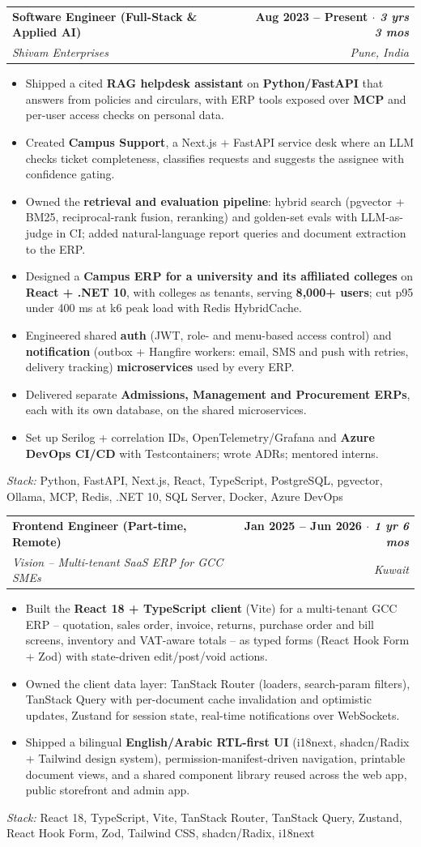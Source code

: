 \documentclass[letterpaper,10pt]{article}
\makeatletter
\newcommand{\resumeItem}[1]{\item\small{{#1 \vspace{-1.5pt}}}}
\newcommand{\resumeTech}[1]{\item[]{\small\textit{Stack:} #1}\vspace{0pt}}
\newcommand{\resumeSubheading}[4]{
  \vspace{-2pt}\item
    \begin{tabular*}{1.0\textwidth}[t]{l@{\extracolsep{\fill}}r}
      \textbf{#1} & \textbf{\small #2} \\
      \textit{\small#3} & \textit{\small #4} \\
    \end{tabular*}\vspace{-5pt}
}
\newcommand{\resumeItemListStart}{\begin{itemize}[label={\textbullet}, leftmargin=0.18in, topsep=2pt, itemsep=0pt]}
\newcommand{\resumeItemListEnd}{\end{itemize}\vspace{-4pt}}
\makeatother
\begin{document}
  \resumeSubheading
    {Software Engineer (Full-Stack \& Applied AI)}{Aug 2023 -- Present \textmd{\textit{$\cdot$ 3 yrs 3 mos}}}
    {Shivam Enterprises}{Pune, India}
    \resumeItemListStart
      \resumeItem{Shipped a cited \textbf{RAG helpdesk assistant} on \textbf{Python/FastAPI} that answers from policies and circulars, with ERP tools exposed over \textbf{MCP} and per-user access checks on personal data.}
      \resumeItem{Created \textbf{Campus Support}, a Next.js + FastAPI service desk where an LLM checks ticket completeness, classifies requests and suggests the assignee with confidence gating.}
      \resumeItem{Owned the \textbf{retrieval and evaluation pipeline}: hybrid search (pgvector + BM25, reciprocal-rank fusion, reranking) and golden-set evals with LLM-as-judge in CI; added natural-language report queries and document extraction to the ERP.}
      \resumeItem{Designed a \textbf{Campus ERP for a university and its affiliated colleges} on \textbf{React + .NET 10}, with colleges as tenants, serving \textbf{8,000+ users}; cut p95 under 400 ms at k6 peak load with Redis HybridCache.}
      \resumeItem{Engineered shared \textbf{auth} (JWT, role- and menu-based access control) and \textbf{notification} (outbox + Hangfire workers: email, SMS and push with retries, delivery tracking) \textbf{microservices} used by every ERP.}
      \resumeItem{Delivered separate \textbf{Admissions, Management and Procurement ERPs}, each with its own database, on the shared microservices.}
      \resumeItem{Set up Serilog + correlation IDs, OpenTelemetry/Grafana and \textbf{Azure DevOps CI/CD} with Testcontainers; wrote ADRs; mentored interns.}
    \resumeItemListEnd
    \resumeTech{Python, FastAPI, Next.js, React, TypeScript, PostgreSQL, pgvector, Ollama, MCP, Redis, .NET 10, SQL Server, Docker, Azure DevOps}

  \resumeSubheading
    {Frontend Engineer (Part-time, Remote)}{Jan 2025 -- Jun 2026 \textmd{\textit{$\cdot$ 1 yr 6 mos}}}
    {Vision -- Multi-tenant SaaS ERP for GCC SMEs}{Kuwait}
    \resumeItemListStart
      \resumeItem{Built the \textbf{React 18 + TypeScript client} (Vite) for a multi-tenant GCC ERP -- quotation, sales order, invoice, returns, purchase order and bill screens, inventory and VAT-aware totals -- as typed forms (React Hook Form + Zod) with state-driven edit/post/void actions.}
      \resumeItem{Owned the client data layer: TanStack Router (loaders, search-param filters), TanStack Query with per-document cache invalidation and optimistic updates, Zustand for session state, real-time notifications over WebSockets.}
      \resumeItem{Shipped a bilingual \textbf{English/Arabic RTL-first UI} (i18next, shadcn/Radix + Tailwind design system), permission-manifest-driven navigation, printable document views, and a shared component library reused across the web app, public storefront and admin app.}
    \resumeItemListEnd
    \resumeTech{React 18, TypeScript, Vite, TanStack Router, TanStack Query, Zustand, React Hook Form, Zod, Tailwind CSS, shadcn/Radix, i18next}
\end{document}
